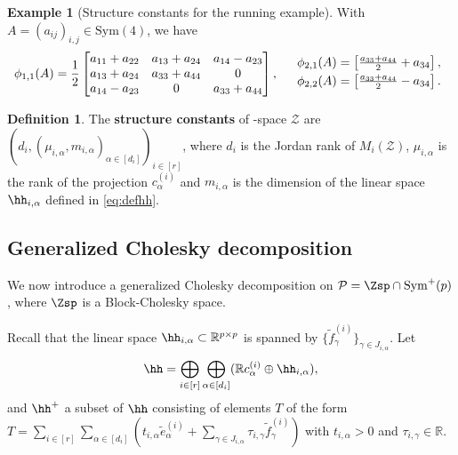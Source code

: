 \documentclass[12pt]{amsart}
\theoremstyle{plain}
\theoremstyle{definition}
\newtheorem{definition}[theorem]{Definition}
\newtheorem{example}[theorem]{Example}
\theoremstyle{remark}
\newcommand{\R}{\mathbb{R}}
\newcommand{\1}{\mathbf{1}}
\begin{document}
\begin{example}[Structure constants for the running example]
With $A=(a_{ij})_{i,j}\in\mathrm{Sym}(4)$, we have 
\[
\phi_{1,1}(A) =   \frac12 \begin{bmatrix}
  a_{11}+a_{22} & a_{13}+a_{24} &  a_{14}-a_{23} \\ 
  a_{13}+a_{24} & a_{33}+a_{44} & 0 \\
  a_{14}-a_{23} & 0 & a_{33}+a_{44}
\end{bmatrix},\quad \begin{array}{ll} \phi_{2,1}(A) = \begin{bmatrix}\frac{a_{33}+a_{44}}{2}+a_{34}\end{bmatrix},\vspace{1mm}\\ \vspace{1mm} \phi_{2,2}(A) = \begin{bmatrix}\frac{a_{33}+a_{44}}{2}-a_{34}\end{bmatrix}.\end{array}
\]
\end{example}



\begin{definition}
    The \textbf{structure constants} of \BC-space $\mathcal{Z}$ are $(d_i, (\mu_{i,\alpha}, m_{i,\alpha})_{\alpha\in[d_i]})_{i\in[r]}$, where $d_i$ is the Jordan rank of $M_i(\mathcal{Z})$, $\mu_{i,\alpha}$ is the rank of the projection $c_{\alpha}^{(i)}$ and $m_{i,\alpha}$ is the dimension of the linear space $\hh_{i,\alpha}$ defined in \eqref{eq:defhh}.
\end{definition}


\subsection{Generalized Cholesky decomposition}\label{sec:gen_cholesky}

We now introduce a generalized Cholesky decomposition on $\mathcal{P}=\Zsp\cap\mathrm{Sym}^+(p)$, where $\Zsp$ is a Block-Cholesky space.


Recall that the linear space $\hh_{i,\alpha} \subset \R^{p \times p}$ is
 spanned by $\{ \tilde{f}^{(i)}_\gamma \}_{\gamma \in J_{i,\alpha}}$.
Let 
\[
\hh=\bigoplus_{i\in[r]} \bigoplus_{\alpha\in[d_i]}(\R c^{(i)}_\alpha \oplus \hh_{i,\alpha}),
\]
 and
 $\hh^+$ a subset of $\hh$ consisting of elements $T$ 
 of the form
$T = \sum_{i\in[r]} \sum_{\alpha\in[d_i]} (t_{i,\alpha} \tilde{e}^{(i)}_\alpha + \sum_{\gamma \in J_{i,\alpha}} \tau_{i,\gamma} \tilde{f}^{(i)}_\gamma )$
 with $t_{i,\alpha}>0$ and $\tau_{i,\gamma} \in \R$.
\end{document}
